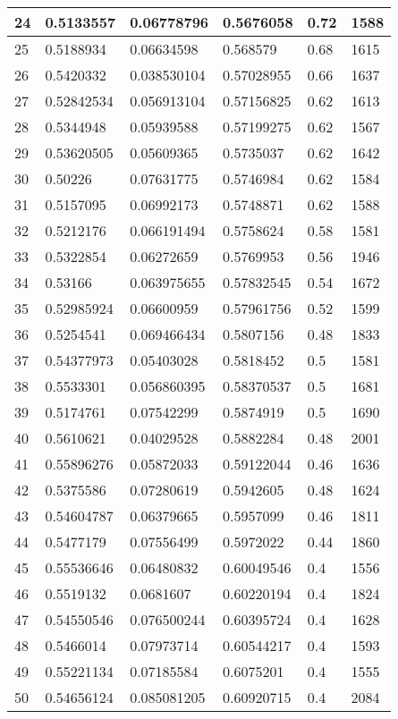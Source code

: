 \begin{longtable}{|l|l|l|l|l|l|}
24 & 0.5133557 & 0.06778796 & 0.5676058 & 0.72 & 1588 \\ \hline 
25 & 0.5188934 & 0.06634598 & 0.568579 & 0.68 & 1615 \\ \hline 
26 & 0.5420332 & 0.038530104 & 0.57028955 & 0.66 & 1637 \\ \hline 
27 & 0.52842534 & 0.056913104 & 0.57156825 & 0.62 & 1613 \\ \hline 
28 & 0.5344948 & 0.05939588 & 0.57199275 & 0.62 & 1567 \\ \hline 
29 & 0.53620505 & 0.05609365 & 0.5735037 & 0.62 & 1642 \\ \hline 
30 & 0.50226 & 0.07631775 & 0.5746984 & 0.62 & 1584 \\ \hline 
31 & 0.5157095 & 0.06992173 & 0.5748871 & 0.62 & 1588 \\ \hline 
32 & 0.5212176 & 0.066191494 & 0.5758624 & 0.58 & 1581 \\ \hline 
33 & 0.5322854 & 0.06272659 & 0.5769953 & 0.56 & 1946 \\ \hline 
34 & 0.53166 & 0.063975655 & 0.57832545 & 0.54 & 1672 \\ \hline 
35 & 0.52985924 & 0.06600959 & 0.57961756 & 0.52 & 1599 \\ \hline 
36 & 0.5254541 & 0.069466434 & 0.5807156 & 0.48 & 1833 \\ \hline 
37 & 0.54377973 & 0.05403028 & 0.5818452 & 0.5 & 1581 \\ \hline 
38 & 0.5533301 & 0.056860395 & 0.58370537 & 0.5 & 1681 \\ \hline 
39 & 0.5174761 & 0.07542299 & 0.5874919 & 0.5 & 1690 \\ \hline 
40 & 0.5610621 & 0.04029528 & 0.5882284 & 0.48 & 2001 \\ \hline 
41 & 0.55896276 & 0.05872033 & 0.59122044 & 0.46 & 1636 \\ \hline 
42 & 0.5375586 & 0.07280619 & 0.5942605 & 0.48 & 1624 \\ \hline 
43 & 0.54604787 & 0.06379665 & 0.5957099 & 0.46 & 1811 \\ \hline 
44 & 0.5477179 & 0.07556499 & 0.5972022 & 0.44 & 1860 \\ \hline 
45 & 0.55536646 & 0.06480832 & 0.60049546 & 0.4 & 1556 \\ \hline 
46 & 0.5519132 & 0.0681607 & 0.60220194 & 0.4 & 1824 \\ \hline 
47 & 0.54550546 & 0.076500244 & 0.60395724 & 0.4 & 1628 \\ \hline 
48 & 0.5466014 & 0.07973714 & 0.60544217 & 0.4 & 1593 \\ \hline 
49 & 0.55221134 & 0.07185584 & 0.6075201 & 0.4 & 1555 \\ \hline 
50 & 0.54656124 & 0.085081205 & 0.60920715 & 0.4 & 2084 \\ \hline 
\end{longtable}
